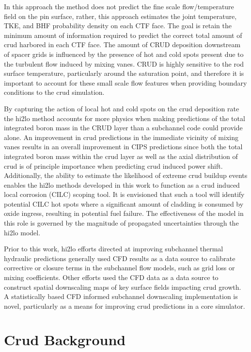 In this approach the method does not predict the fine scale flow/temperature field on the pin surface, rather, this approach estimates the joint temperature, TKE, and BHF probability density on each CTF face.  The goal is retain the minimum amount of information required to predict the correct total amount of crud harbored in each CTF face.  The amount of CRUD deposition downstream of spacer grids is influenced by the presence of hot and cold spots present due to the turbulent flow induced by mixing vanes.  CRUD is highly sensitive to the rod surface temperature, particularly around the saturation point, and therefore it is important to account for these small scale flow features when providing boundary conditions to the crud simulation.

By capturing the action of local hot and cold spots on the crud deposition rate the hi2lo method accounts for more physics when making predictions of the total integrated boron mass in the CRUD layer than a subchannel code could provide alone.  An improvement in crud predictions in the immediate vicinity of mixing vanes results in an overall improvement in CIPS predictions since both the total integrated boron mass within the crud layer as well as the axial distribution of crud is of principle importance when predicting crud induced power shift.  Additionally, the ability to estimate the likelihood of extreme crud buildup events enables the hi2lo methods developed in this work to function as a crud induced local corrosion (CILC) scoping tool.  It is envisioned that such a tool will identify potential CILC hot spots where a significant amount of cladding is consumed by oxide ingress, resulting in potential fuel failure.  The effectiveness of the model in this role is governed by the magnitude of propagated uncertainties through the hi2lo model.

Prior to this work, hi2lo efforts directed at improving subchannel thermal hydraulic predictions generally used CFD results as a data source to calibrate corrective or closure terms in the subchannel flow models, such as grid loss or mixing coefficients.  Other efforts used the CFD data as a data source to construct spatial downscaling maps of key surface fields impacting crud growth.  A statistically based CFD informed subchannel downscaling implementation is novel, particularly as a means for improving crud predictions in a core simulator.

\section{Crud Background}

